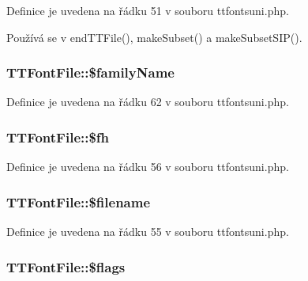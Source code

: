 Definice je uvedena na řádku 51 v souboru ttfontsuni.\-php.



Používá se v end\-T\-T\-File(), make\-Subset() a make\-Subset\-S\-I\-P().

\hypertarget{class_t_t_font_file_a4a1c8a2c37d346f1f3d1e19c1b2ee4a4}{
\subsubsection[{\$family\-Name}]{\setlength{\rightskip}{0pt plus 5cm}T\-T\-Font\-File\-::\$family\-Name}}\label{class_t_t_font_file_a4a1c8a2c37d346f1f3d1e19c1b2ee4a4}


Definice je uvedena na řádku 62 v souboru ttfontsuni.\-php.

\hypertarget{class_t_t_font_file_a562d0f1cbfc7c313ac6b1ecd0019d88d}{
\subsubsection[{\$fh}]{\setlength{\rightskip}{0pt plus 5cm}T\-T\-Font\-File\-::\$fh}}\label{class_t_t_font_file_a562d0f1cbfc7c313ac6b1ecd0019d88d}


Definice je uvedena na řádku 56 v souboru ttfontsuni.\-php.

\hypertarget{class_t_t_font_file_a52570f4311514c287c9547e8a0d8f3a3}{
\subsubsection[{\$filename}]{\setlength{\rightskip}{0pt plus 5cm}T\-T\-Font\-File\-::\$filename}}\label{class_t_t_font_file_a52570f4311514c287c9547e8a0d8f3a3}


Definice je uvedena na řádku 55 v souboru ttfontsuni.\-php.

\hypertarget{class_t_t_font_file_af378d0526699871a8ea63f183a375030}{
\subsubsection[{\$flags}]{\setlength{\rightskip}{0pt plus 5cm}T\-T\-Font\-File\-::\$flags}}\label{class_t_t_font_file_af378d0526699871a8ea63f183a375030}


